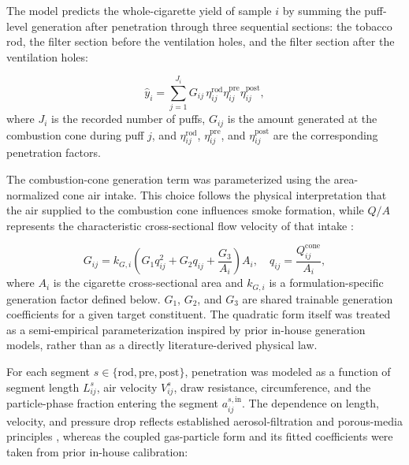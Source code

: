 ﻿\documentclass[a4paper,fleqn]{cas-sc}
\begin{document}
The model predicts the whole-cigarette yield of sample $i$ by summing the puff-level generation after penetration through three sequential sections: the tobacco rod, the filter section before the ventilation holes, and the filter section after the ventilation holes:

\[
\hat{y}_i=\sum_{j=1}^{J_i}G_{ij}\,
\eta_{ij}^{\mathrm{rod}}\eta_{ij}^{\mathrm{pre}}\eta_{ij}^{\mathrm{post}},
\]
where $J_i$ is the recorded number of puffs, $G_{ij}$ is the amount generated at the combustion cone during puff $j$, and $\eta_{ij}^{\mathrm{rod}}$, $\eta_{ij}^{\mathrm{pre}}$, and $\eta_{ij}^{\mathrm{post}}$ are the corresponding penetration factors.

The combustion-cone generation term was parameterized using the area-normalized cone air intake. This choice follows the physical interpretation that the air supplied to the combustion cone influences smoke formation, while $Q/A$ represents the characteristic cross-sectional flow velocity of that intake \cite{torero2020smouldering,pauwels2018ventilation,xu2020airfiltering}:

\[
G_{ij}=k_{G,i}\left(G_1q_{ij}^{2}+G_2q_{ij}+\frac{G_3}{A_i}\right)A_i,
\quad
q_{ij}=\frac{Q_{ij}^{\mathrm{cone}}}{A_i},
\]
where $A_i$ is the cigarette cross-sectional area and $k_{G,i}$ is a formulation-specific generation factor defined below. $G_1$, $G_2$, and $G_3$ are shared trainable generation coefficients for a given target constituent. The quadratic form itself was treated as a semi-empirical parameterization inspired by prior in-house generation models, rather than as a directly literature-derived physical law.

For each segment $s\in\{\mathrm{rod},\mathrm{pre},\mathrm{post}\}$, penetration was modeled as a function of segment length $L_{ij}^{s}$, air velocity $V_{ij}^{s}$, draw resistance, circumference, and the particle-phase fraction entering the segment $a_{ij}^{s,\mathrm{in}}$. The dependence on length, velocity, and pressure drop reflects established aerosol-filtration and porous-media principles \cite{liu2020particulate,xu2020airfiltering}, whereas the coupled gas-particle form and its fitted coefficients were taken from prior in-house calibration:
\end{document}
